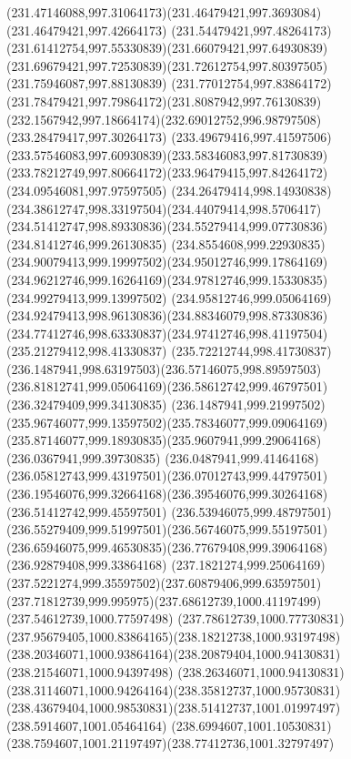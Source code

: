 {    \curveto(231.47146088,997.31064173)(231.46479421,997.3693084)(231.46479421,997.42664173)
    \curveto(231.54479421,997.48264173)(231.61412754,997.55330839)(231.66079421,997.64930839)
    \curveto(231.69679421,997.72530839)(231.72612754,997.80397505)(231.75946087,997.88130839)
    \curveto(231.77012754,997.83864172)(231.78479421,997.79864172)(231.8087942,997.76130839)
    \curveto(232.1567942,997.18664174)(232.69012752,996.98797508)(233.28479417,997.30264173)
    \curveto(233.49679416,997.41597506)(233.57546083,997.60930839)(233.58346083,997.81730839)
    \curveto(233.78212749,997.80664172)(233.96479415,997.84264172)(234.09546081,997.97597505)
    \curveto(234.26479414,998.14930838)(234.38612747,998.33197504)(234.44079414,998.5706417)
    \curveto(234.51412747,998.89330836)(234.55279414,999.07730836)(234.81412746,999.26130835)
    \curveto(234.8554608,999.22930835)(234.90079413,999.19997502)(234.95012746,999.17864169)
    \curveto(234.96212746,999.16264169)(234.97812746,999.15330835)(234.99279413,999.13997502)
    \curveto(234.95812746,999.05064169)(234.92479413,998.96130836)(234.88346079,998.87330836)
    \curveto(234.77412746,998.63330837)(234.97412746,998.41197504)(235.21279412,998.41330837)
    \curveto(235.72212744,998.41730837)(236.1487941,998.63197503)(236.57146075,998.89597503)
    \curveto(236.81812741,999.05064169)(236.58612742,999.46797501)(236.32479409,999.34130835)
    \curveto(236.1487941,999.21997502)(235.96746077,999.13597502)(235.78346077,999.09064169)
    \curveto(235.87146077,999.18930835)(235.9607941,999.29064168)(236.0367941,999.39730835)
    \curveto(236.0487941,999.41464168)(236.05812743,999.43197501)(236.07012743,999.44797501)
    \curveto(236.19546076,999.32664168)(236.39546076,999.30264168)(236.51412742,999.45597501)
    \curveto(236.53946075,999.48797501)(236.55279409,999.51997501)(236.56746075,999.55197501)
    \curveto(236.65946075,999.46530835)(236.77679408,999.39064168)(236.92879408,999.33864168)
    \curveto(237.1821274,999.25064169)(237.5221274,999.35597502)(237.60879406,999.63597501)
    \curveto(237.71812739,999.995975)(237.68612739,1000.41197499)(237.54612739,1000.77597498)
    \curveto(237.78612739,1000.77730831)(237.95679405,1000.83864165)(238.18212738,1000.93197498)
    \curveto(238.20346071,1000.93864164)(238.20879404,1000.94130831)(238.21546071,1000.94397498)
    \curveto(238.26346071,1000.94130831)(238.31146071,1000.94264164)(238.35812737,1000.95730831)
    \curveto(238.43679404,1000.98530831)(238.51412737,1001.01997497)(238.5914607,1001.05464164)
    \curveto(238.6994607,1001.10530831)(238.7594607,1001.21197497)(238.77412736,1001.32797497)
}
